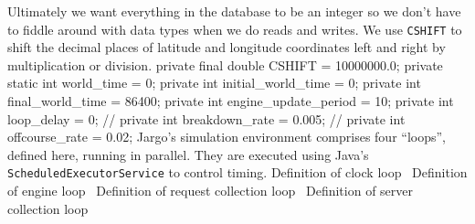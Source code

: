 \documentclass{article}
\newcommand{\hi}[1]{\noindent {\bf #1}}     %
\def\nwendcode{\endtrivlist \endgroup}      %
\let\nwdocspar=\par
\begin{document}
Ultimately we want everything in the database to be an integer so we don't have
to fiddle around with data types when we do reads and writes. We use {\tt{}\protect{}CSHIFT}
to shift the decimal places of latitude and longitude coordinates left and
right by multiplication or division.
\nwenddocs{}\endmoddef{}
private final double CSHIFT = 10000000.0;
private static int world_time = 0;
private int initial_world_time = 0;
private int final_world_time = 86400;
private int engine_update_period = 10;
private int loop_delay = 0;
// private int breakdown_rate = 0.005;
// private int offcourse_rate = 0.02;
\eatline
{}\nwendcode{}\hi{Loops.} Jargo's simulation environment comprises four ``loops'', defined
here, running in parallel. They are executed using Java's
{\tt{}ScheduledExecutorService} to control timing.
\nwenddocs{}\endmoddef{}
\LA{}Definition of clock loop~{\nwtagstyle{}}\RA{}
\LA{}Definition of engine loop~{\nwtagstyle{}}\RA{}
\LA{}Definition of request collection loop~{\nwtagstyle{}}\RA{}
\LA{}Definition of server collection loop~{\nwtagstyle{}}\RA{}
\nwendcode{}\nwdocspar
\end{document}
